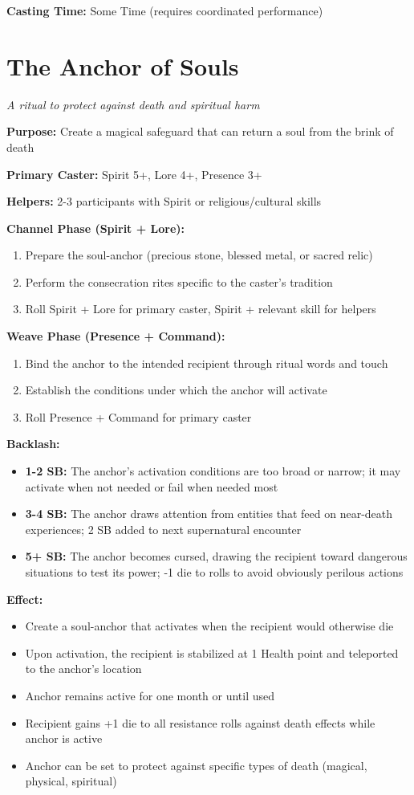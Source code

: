 \textbf{Casting Time:} Some Time (requires coordinated performance)

\section*{The Anchor of Souls}
\textit{A ritual to protect against death and spiritual harm}

\textbf{Purpose:} Create a magical safeguard that can return a soul from the brink of death

\textbf{Primary Caster:} Spirit 5+, Lore 4+, Presence 3+

\textbf{Helpers:} 2-3 participants with Spirit or religious/cultural skills

\textbf{Channel Phase (Spirit + Lore):}
\begin{enumerate}
\item Prepare the soul-anchor (precious stone, blessed metal, or sacred relic)
\item Perform the consecration rites specific to the caster's tradition
\item Roll Spirit + Lore for primary caster, Spirit + relevant skill for helpers
\end{enumerate}

\textbf{Weave Phase (Presence + Command):}
\begin{enumerate}
\item Bind the anchor to the intended recipient through ritual words and touch
\item Establish the conditions under which the anchor will activate
\item Roll Presence + Command for primary caster
\end{enumerate}

\textbf{Backlash:}
\begin{itemize}
\item \textbf{1-2 SB:} The anchor's activation conditions are too broad or narrow; it may activate when not needed or fail when needed most
\item \textbf{3-4 SB:} The anchor draws attention from entities that feed on near-death experiences; 2 SB added to next supernatural encounter
\item \textbf{5+ SB:} The anchor becomes cursed, drawing the recipient toward dangerous situations to test its power; -1 die to rolls to avoid obviously perilous actions
\end{itemize}

\textbf{Effect:}
\begin{itemize}
\item Create a soul-anchor that activates when the recipient would otherwise die
\item Upon activation, the recipient is stabilized at 1 Health point and teleported to the anchor's location
\item Anchor remains active for one month or until used
\item Recipient gains +1 die to all resistance rolls against death effects while anchor is active
\item Anchor can be set to protect against specific types of death (magical, physical, spiritual)
\end{itemize}

